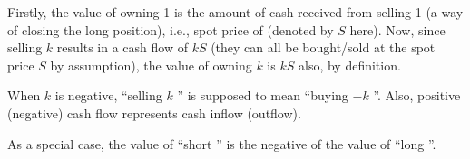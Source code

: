 \begin{enumerate}
\begin{pf}
Firstly, the value of owning 1  is the amount of cash
 received from selling 1  (a way of closing
the long position), i.e., spot price of  (denoted by \(S\)
here). Now, since selling \(k\)  results in a cash flow of
\(kS\) (they can all be bought/sold at the spot price \(S\) by assumption), the
value of owning \(k\)  is \(kS\) also, by definition.

\begin{note}
When \(k\) is negative, ``selling \(k\) '' is supposed to
mean ``buying \(-k\) ''. Also, positive (negative) cash flow
represents cash inflow (outflow).
\end{note}
\end{pf}

As a special case, the value of ``short '' is the negative of
the value of ``long ''.
\end{enumerate}
